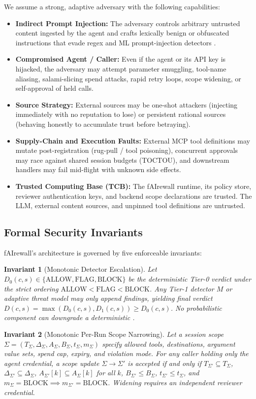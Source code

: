 \documentclass[conference]{IEEEtran}
\newtheorem{invariant}{Invariant}
\begin{document}
We assume a strong, adaptive adversary with the following capabilities:
\begin{itemize}
    \item \textbf{Indirect Prompt Injection:} The adversary controls arbitrary untrusted content ingested by the agent and crafts lexically benign or obfuscated instructions that evade regex and ML prompt-injection detectors \cite{zhan2025adaptive}.
    \item \textbf{Compromised Agent / Caller:} Even if the agent or its API key is hijacked, the adversary may attempt parameter smuggling, tool-name aliasing, salami-slicing spend attacks, rapid retry loops, scope widening, or self-approval of held calls.
    \item \textbf{Source Strategy:} External sources may be one-shot attackers (injecting immediately with no reputation to lose) or persistent rational sources (behaving honestly to accumulate trust before betraying).
    \item \textbf{Supply-Chain and Execution Faults:} External MCP tool definitions may mutate post-registration (rug-pull / tool poisoning), concurrent approvals may race against shared session budgets (TOCTOU), and downstream handlers may fail mid-flight with unknown side effects.
    \item \textbf{Trusted Computing Base (TCB):} The fAIrewall runtime, its policy store, reviewer authentication keys, and backend scope declarations are trusted. The LLM, external content sources, and unpinned tool definitions are untrusted.
\end{itemize}

\subsection{Formal Security Invariants}
fAIrewall's architecture is governed by five enforceable invariants:

\begin{invariant}[Monotonic Detector Escalation]
Let $D_0(c, s) \in \{\text{ALLOW}, \text{FLAG}, \text{BLOCK}\}$ be the deterministic Tier-0 verdict under the strict ordering $\text{ALLOW} < \text{FLAG} < \text{BLOCK}$. Any Tier-1 detector $M$ or adaptive threat model may only append findings, yielding final verdict $D(c, s) = \max(D_0(c, s), D_1(c, s)) \ge D_0(c, s)$. No probabilistic component can downgrade a deterministic .
\end{invariant}

\begin{invariant}[Monotonic Per-Run Scope Narrowing]
Let a session scope $\Sigma = (T_\Sigma, \Delta_\Sigma, A_\Sigma, B_\Sigma, t_\Sigma, m_\Sigma)$ specify allowed tools, destinations, argument value sets, spend cap, expiry, and violation mode. For any caller holding only the agent credential, a scope update $\Sigma \to \Sigma'$ is accepted if and only if $T_{\Sigma'} \subseteq T_\Sigma$, $\Delta_{\Sigma'} \subseteq \Delta_\Sigma$, $A_{\Sigma'}[k] \subseteq A_\Sigma[k]$ for all $k$, $B_{\Sigma'} \le B_\Sigma$, $t_{\Sigma'} \le t_\Sigma$, and $m_\Sigma = \text{BLOCK} \implies m_{\Sigma'} = \text{BLOCK}$. Widening requires an independent reviewer credential.
\end{invariant}
\end{document}
